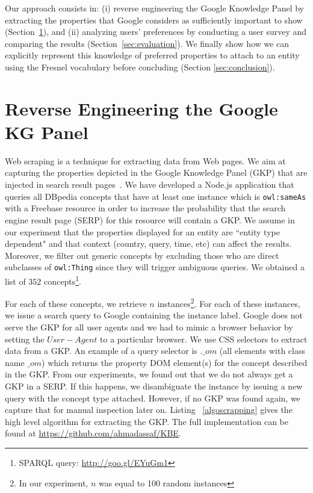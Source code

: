 \documentclass[runningheads,a4paper]{llncs}
\begin{document}
Our approach consists in: (i) reverse engineering the Google Knowledge Panel by extracting the properties that Google considers as sufficiently important to show (Section~\ref{sec:knowledge-graph}), and (ii) analyzing users' preferences by conducting a user survey and comparing the results (Section~\ref{sec:evaluation}). We finally show how we can explicitly represent this knowledge of preferred properties to attach to an entity using the Fresnel vocabulary before concluding (Section \ref{sec:conclusion}).


\section{Reverse Engineering the Google KG Panel}
\label{sec:knowledge-graph}
Web scraping is a technique for extracting data from Web pages. We aim at capturing the properties depicted in the Google Knowledge Panel (GKP) that are injected in search result pages~\cite{Bergman2012}. We have developed a Node.js application that queries all DBpedia concepts that have at least one instance which is \texttt{owl:sameAs} with a Freebase resource in order to increase the probability that the search engine result page (SERP) for this resource will contain a GKP. We assume in our experiment that the properties displayed for an entity are ``entity type dependent" and that context (country, query, time, etc) can affect the results.  Moreover, we filter out generic concepts by excluding those who are direct subclasses of \texttt{owl:Thing} since they will trigger ambiguous queries. We obtained a list of $352$ concepts\footnote{SPARQL query: \url{http://goo.gl/EYuGm1}}.

For each of these concepts, we retrieve $n$ instances\footnote{In our experiment, $n$ was equal to 100 random instances}. For each of these instances, we issue a search query to Google containing the instance label. Google does not serve the GKP for all user agents and we had to mimic a browser behavior by setting the $User-Agent$ to a particular browser. We use CSS selectors  to extract data from a GKP. An example of a query selector is $.\_om$ (all elements with class name $\_om$) which returns the property DOM element(s) for the concept described in the GKP. From our experiments, we found out that we do not always get a GKP in a SERP. If this happens, we disambiguate the instance by issuing a new query with the concept type attached. However, if no GKP was found again, we capture that for manual inspection later on. Listing ~\ref{algoscrapping} gives the high level algorithm for extracting the GKP. The full implementation can be found at \url{https://github.com/ahmadassaf/KBE}.
\end{document}
